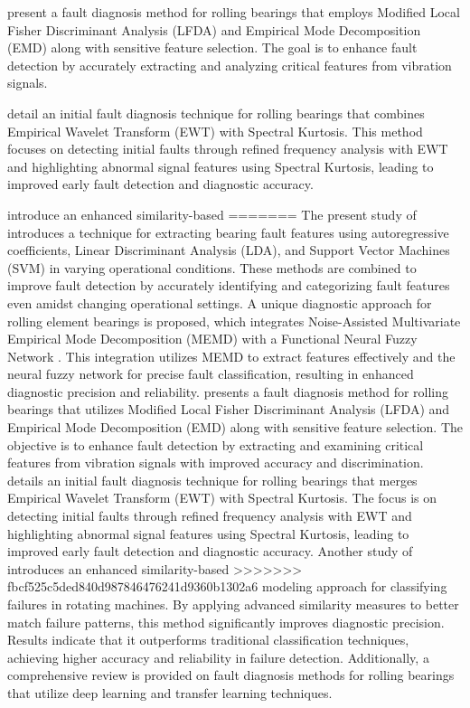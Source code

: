 \documentclass[sn-basic,pdflatex]{sn-jnl}
\theoremstyle{remark}
\theoremstyle{definition}
\begin{document}
\citet{WOS:000426284100001} present a fault diagnosis method for rolling
bearings that employs Modified Local Fisher Discriminant Analysis (LFDA)
and Empirical Mode Decomposition (EMD) along with sensitive feature
selection. The goal is to enhance fault detection by accurately
extracting and analyzing critical features from vibration signals.

\citet{WOS:000539546400083} detail an initial fault diagnosis technique
for rolling bearings that combines Empirical Wavelet Transform (EWT)
with Spectral Kurtosis. This method focuses on detecting initial faults
through refined frequency analysis with EWT and highlighting abnormal
signal features using Spectral Kurtosis, leading to improved early fault
detection and diagnostic accuracy.

\citet{hakim2023systematic} introduce an enhanced similarity-based
=======
The present study of \citet{WOS:000440977000032} introduces a technique
for extracting bearing fault features using autoregressive coefficients,
Linear Discriminant Analysis (LDA), and Support Vector Machines (SVM) in
varying operational conditions. These methods are combined to improve
fault detection by accurately identifying and categorizing fault
features even amidst changing operational settings. A unique diagnostic
approach for rolling element bearings is proposed, which integrates
Noise-Assisted Multivariate Empirical Mode Decomposition (MEMD) with a
Functional Neural Fuzzy Network \citep{WOS:000434717400001}. This
integration utilizes MEMD to extract features effectively and the neural
fuzzy network for precise fault classification, resulting in enhanced
diagnostic precision and reliability. \citet{WOS:000426284100001}
presents a fault diagnosis method for rolling bearings that utilizes
Modified Local Fisher Discriminant Analysis (LFDA) and Empirical Mode
Decomposition (EMD) along with sensitive feature selection. The
objective is to enhance fault detection by extracting and examining
critical features from vibration signals with improved accuracy and
discrimination. \citet{WOS:000539546400083} details an initial fault
diagnosis technique for rolling bearings that merges Empirical Wavelet
Transform (EWT) with Spectral Kurtosis. The focus is on detecting
initial faults through refined frequency analysis with EWT and
highlighting abnormal signal features using Spectral Kurtosis, leading
to improved early fault detection and diagnostic accuracy. Another study
of \citet{hakim2023systematic} introduces an enhanced similarity-based
>>>>>>> fbcf525c5ded840d987846476241d9360b1302a6
modeling approach for classifying failures in rotating machines. By
applying advanced similarity measures to better match failure patterns,
this method significantly improves diagnostic precision. Results
indicate that it outperforms traditional classification techniques,
achieving higher accuracy and reliability in failure detection.
Additionally, a comprehensive review is provided on fault diagnosis
methods for rolling bearings that utilize deep learning and transfer
learning techniques.
\end{document}
